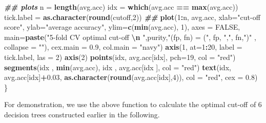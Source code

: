 \documentclass[
]{book}
\newenvironment{Shaded}{\begin{snugshade}}{\end{snugshade}}
\newcommand{\AttributeTok}[1]{\textcolor[rgb]{0.13,0.29,0.53}{#1}}
\newcommand{\ConstantTok}[1]{\textcolor[rgb]{0.56,0.35,0.01}{#1}}
\newcommand{\DecValTok}[1]{\textcolor[rgb]{0.00,0.00,0.81}{#1}}
\newcommand{\DocumentationTok}[1]{\textcolor[rgb]{0.56,0.35,0.01}{\textbf{\textit{#1}}}}
\newcommand{\FloatTok}[1]{\textcolor[rgb]{0.00,0.00,0.81}{#1}}
\newcommand{\FunctionTok}[1]{\textcolor[rgb]{0.13,0.29,0.53}{\textbf{#1}}}
\newcommand{\NormalTok}[1]{#1}
\newcommand{\OtherTok}[1]{\textcolor[rgb]{0.56,0.35,0.01}{#1}}
\newcommand{\SpecialCharTok}[1]{\textcolor[rgb]{0.81,0.36,0.00}{\textbf{#1}}}
\newcommand{\StringTok}[1]{\textcolor[rgb]{0.31,0.60,0.02}{#1}}
\begin{document}
\begin{Shaded}
\begin{Highlighting}[]
   \DocumentationTok{\#\# plots}
\NormalTok{   n }\OtherTok{=} \FunctionTok{length}\NormalTok{(avg.acc)}
\NormalTok{   idx }\OtherTok{=} \FunctionTok{which}\NormalTok{(avg.acc }\SpecialCharTok{==} \FunctionTok{max}\NormalTok{(avg.acc))}
\NormalTok{   tick.label }\OtherTok{=} \FunctionTok{as.character}\NormalTok{(}\FunctionTok{round}\NormalTok{(cutoff,}\DecValTok{2}\NormalTok{))}
   \DocumentationTok{\#\#}
   \FunctionTok{plot}\NormalTok{(}\DecValTok{1}\SpecialCharTok{:}\NormalTok{n, avg.acc, }\AttributeTok{xlab=}\StringTok{"cut{-}off score"}\NormalTok{, }\AttributeTok{ylab=}\StringTok{"average accuracy"}\NormalTok{, }
        \AttributeTok{ylim=}\FunctionTok{c}\NormalTok{(}\FunctionTok{min}\NormalTok{(avg.acc), }\DecValTok{1}\NormalTok{), }
        \AttributeTok{axes =} \ConstantTok{FALSE}\NormalTok{,}
        \AttributeTok{main=}\FunctionTok{paste}\NormalTok{(}\StringTok{"5{-}fold CV optimal cut{-}off }\SpecialCharTok{\textbackslash{}n}\StringTok{ "}\NormalTok{,purity,}\StringTok{"(fp, fn) = ("}\NormalTok{, fp, }\StringTok{","}\NormalTok{, fn,}\StringTok{")"}\NormalTok{ , }\AttributeTok{collapse =} \StringTok{""}\NormalTok{),}
        \AttributeTok{cex.main =} \FloatTok{0.9}\NormalTok{,}
        \AttributeTok{col.main =} \StringTok{"navy"}\NormalTok{)}
        \FunctionTok{axis}\NormalTok{(}\DecValTok{1}\NormalTok{, }\AttributeTok{at=}\DecValTok{1}\SpecialCharTok{:}\DecValTok{20}\NormalTok{, }\AttributeTok{label =}\NormalTok{ tick.label, }\AttributeTok{las =} \DecValTok{2}\NormalTok{)}
        \FunctionTok{axis}\NormalTok{(}\DecValTok{2}\NormalTok{)}
        \FunctionTok{points}\NormalTok{(idx, avg.acc[idx], }\AttributeTok{pch=}\DecValTok{19}\NormalTok{, }\AttributeTok{col =} \StringTok{"red"}\NormalTok{)}
        \FunctionTok{segments}\NormalTok{(idx , }\FunctionTok{min}\NormalTok{(avg.acc), idx , avg.acc[idx ], }\AttributeTok{col =} \StringTok{"red"}\NormalTok{)}
       \FunctionTok{text}\NormalTok{(idx, avg.acc[idx]}\SpecialCharTok{+}\FloatTok{0.03}\NormalTok{, }\FunctionTok{as.character}\NormalTok{(}\FunctionTok{round}\NormalTok{(avg.acc[idx],}\DecValTok{4}\NormalTok{)), }\AttributeTok{col =} \StringTok{"red"}\NormalTok{, }\AttributeTok{cex =} \FloatTok{0.8}\NormalTok{) }
\NormalTok{   \}}
\end{Highlighting}
\end{Shaded}

For demonstration, we use the above function to calculate the optimal cut-off of 6 decision trees constructed earlier in the following.
\end{document}
